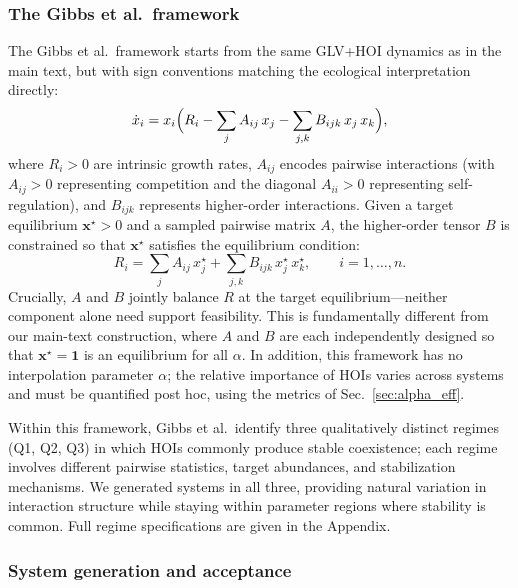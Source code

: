 \documentclass[pdflatex,sn-mathphys-num]{sn-jnl}%
\begin{document}
\subsubsection{The Gibbs et al.\ framework}

The Gibbs et al.\ framework starts from the same GLV+HOI dynamics as in the main text, but with sign conventions matching the ecological interpretation directly:
\begin{equation}
 \dot{x}_i = x_i \Bigl( R_i - \sum_{j} A_{ij}\, x_j - \sum_{j,k} B_{ijk}\, x_j\, x_k \Bigr),
 \label{eq:gibbs_dynamics}
\end{equation}
where $R_i > 0$ are intrinsic growth rates, $A_{ij}$ encodes pairwise interactions (with $A_{ij} > 0$ representing competition and the diagonal $A_{ii} > 0$ representing self-regulation), and $B_{ijk}$ represents higher-order interactions. Given a target equilibrium $\mathbf{x}^\star > 0$ and a sampled pairwise matrix $A$, the higher-order tensor $B$ is constrained so that $\mathbf{x}^\star$ satisfies the equilibrium condition:
\begin{equation}
 R_i = \sum_j A_{ij}\, x^\star_j + \sum_{j,k} B_{ijk}\, x^\star_j\, x^\star_k, \qquad i = 1, \ldots, n.
 \label{eq:gibbs_constraint}
\end{equation}
Crucially, $A$ and $B$ jointly balance $R$ at the target equilibrium---neither component alone need support feasibility. This is fundamentally different from our main-text construction, where $A$ and $B$ are each independently designed so that $\mathbf{x}^\star = \mathbf{1}$ is an equilibrium for all $\alpha$. In addition, this framework has no interpolation parameter $\alpha$; the relative importance of HOIs varies across systems and must be quantified post hoc, using the metrics of Sec.~\ref{sec:alpha_eff}.

Within this framework, Gibbs et al.\ identify three qualitatively distinct regimes (Q1, Q2, Q3) in which HOIs commonly produce stable coexistence; each regime involves different pairwise statistics, target abundances, and stabilization mechanisms. We generated systems in all three, providing natural variation in interaction structure while staying within parameter regions where stability is common. Full regime specifications are given in the Appendix.

\subsubsection{System generation and acceptance}
\end{document}
